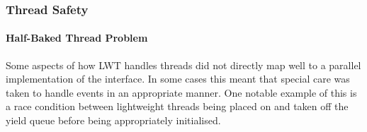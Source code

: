 \documentclass[12pt,twoside,notitlepage]{report}
\begin{document}
%
%

%
%
\subsubsection{Thread Safety}
\label{subsubsec:thread_safety}
%
%

\paragraph{Half-Baked Thread Problem}
\label{para:half-baked_thread_problem}
%
%
Some aspects of how LWT handles threads did not directly map well to a parallel implementation of the interface. In some cases this meant that special care was taken to handle events in an appropriate manner. One notable example
of this is a race condition between lightweight threads being placed on and taken off the yield queue before being appropriately initialised.
\end{document}

